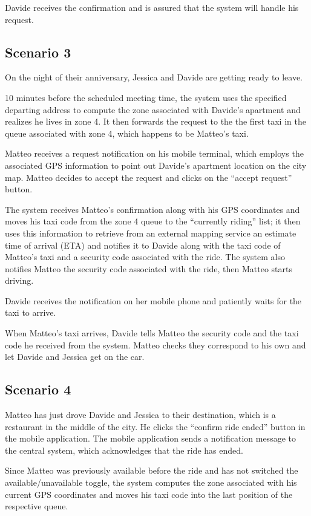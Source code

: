 Davide receives the confirmation and is assured that the system will handle his request.


\subsection{Scenario 3}
On the night of their anniversary, Jessica and Davide are getting ready to leave.

10 minutes before the scheduled meeting time, the system uses the specified departing address to compute the zone associated with Davide’s apartment and realizes he lives in zone 4. It then forwards the request to the the first taxi in the queue associated with zone 4, which happens to be Matteo’s taxi.

Matteo receives a request notification on his mobile terminal, which employs the associated GPS information to point out Davide’s apartment location on the city map. Matteo decides to accept the request and clicks on the “accept request” button.

The system receives Matteo’s confirmation along with his GPS coordinates and moves his taxi code from the zone 4 queue to the “currently riding” list; it then uses this information to retrieve from an external mapping service an estimate time of arrival (ETA) and notifies it to Davide along with the taxi code of Matteo’s taxi and a security code associated with the ride. The system also notifies Matteo the security code associated with the ride, then Matteo starts driving.

Davide receives the notification on her mobile phone and patiently waits for the taxi to arrive.

When Matteo’s taxi arrives, Davide tells Matteo the security code and the taxi code he received from the system. Matteo checks they correspond to his own and let Davide and Jessica get on the car.


\subsection{Scenario 4}
Matteo has just drove Davide and Jessica to their destination, which is a restaurant in the middle of the city. He clicks the “confirm ride ended” button in the mobile application. The mobile application sends a notification message to the central system, which acknowledges that the ride has ended.

Since Matteo was previously available before the ride and has not switched the available/unavailable toggle, the system computes the zone associated with his current GPS coordinates and moves his taxi code into the last position of the respective queue.



